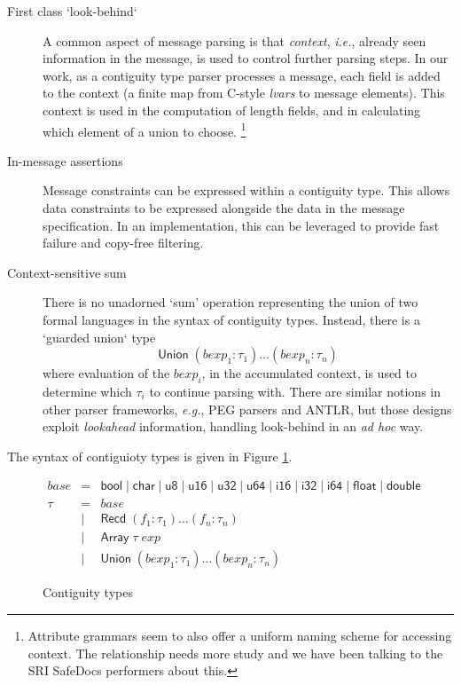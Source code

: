 \documentclass{article}
\newcommand{\ie}{\textit{i.e.}}
\newcommand{\eg}{\textit{e.g.}}
\newcommand{\adhoc}{\textit{ad hoc}}
\newcommand{\konst}[1]{\ensuremath{\mathsf{#1}}}
\begin{document}
\begin{description}

\item [First class `look-behind`] A common aspect of message parsing
  is that \emph{context}, \ie, already seen information in the
  message, is used to control further parsing steps. In our work, as a
  contiguity type parser processes a message, each field is added to
  the context (a finite map from C-style \emph{lvars} to message
  elements). This context is used in the computation of length fields,
  and in calculating which element of a union to
  choose. \footnote{Attribute grammars seem to also offer a uniform
    naming scheme for accessing context. The relationship needs more
    study and we have been talking to the SRI SafeDocs performers
    about this.}

\item [In-message assertions] Message constraints can be expressed
  within a contiguity type. This allows data constraints to be
  expressed alongside the data in the message specification. In an
  implementation, this can be leveraged to provide fast failure and
  copy-free filtering.

\item [Context-sensitive sum] There is no unadorned `sum' operation
  representing the union of two formal languages in the syntax of
  contiguity types. Instead, there is a `guarded union` type
  \[
    \konst{Union}\; (\mathit{bexp}_1 : \tau_1) \ldots (\mathit{bexp}_n : \tau_n)
  \]
  where evaluation of the $\mathit{bexp}_i$, in the accumulated
  context, is used to determine which $\tau_i$ to continue parsing
  with. There are similar notions in other parser frameworks, \eg, PEG
  parsers and ANTLR, but those designs exploit \emph{lookahead}
  information, handling look-behind in an \adhoc{} way.

\end{description}

The syntax of contiguioty types is given in Figure \ref{contig-types}.

\begin{figure}
\[
\begin{array}{rcl}
 \mathit{base} & = & \konst{bool} \mid \konst{char} \mid \konst{u8} \mid
 \konst{u16} \mid \konst{u32} \mid \konst{u64}  \mid \konst{i16} \mid
 \konst{i32} \mid \konst{i64} \mid \konst{float} \mid \konst{double} \\
 \tau & = & \mathit{base} \\
      & \mid & \konst{Recd}\; (f_1 : \tau_1) \ldots (f_n : \tau_n) \\
      & \mid & \konst{Array}\; \tau \; \mathit{exp} \\
      & \mid & \konst{Union}\; (\mathit{bexp}_1 : \tau_1) \ldots (\mathit{bexp}_n : \tau_n)
\end{array}
\]
\label{contig-types}
\caption{Contiguity types}
\end{figure}
\end{document}
